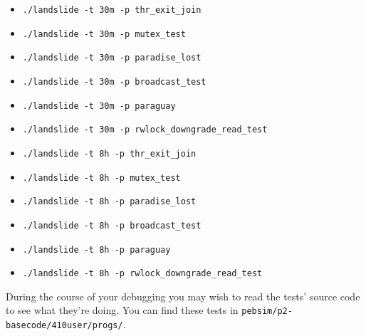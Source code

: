 \documentclass{article}
\begin{document}
\begin{enumerate}
\begin{enumerate}
\begin{enumerate}
					\begin{itemize}
						\item \texttt{./landslide -t 30m -p thr\_exit\_join}
						\item \texttt{./landslide -t 30m -p mutex\_test}
						\item \texttt{./landslide -t 30m -p paradise\_lost}
						\item \texttt{./landslide -t 30m -p broadcast\_test}
						\item \texttt{./landslide -t 30m -p paraguay}
						\item \texttt{./landslide -t 30m -p rwlock\_downgrade\_read\_test}
							\\
						\item \texttt{./landslide -t 8h -p thr\_exit\_join}
						\item \texttt{./landslide -t 8h -p mutex\_test}
						\item \texttt{./landslide -t 8h -p paradise\_lost}
						\item \texttt{./landslide -t 8h -p broadcast\_test}
						\item \texttt{./landslide -t 8h -p paraguay}
						\item \texttt{./landslide -t 8h -p rwlock\_downgrade\_read\_test}
					\end{itemize}
				\end{enumerate}
				During the course of your debugging you may wish to read the tests' source code to see what they're doing. You can find these tests in {\tt pebsim/p2-basecode/410user/progs/}.

\end{enumerate}
\end{enumerate}
\end{document}
